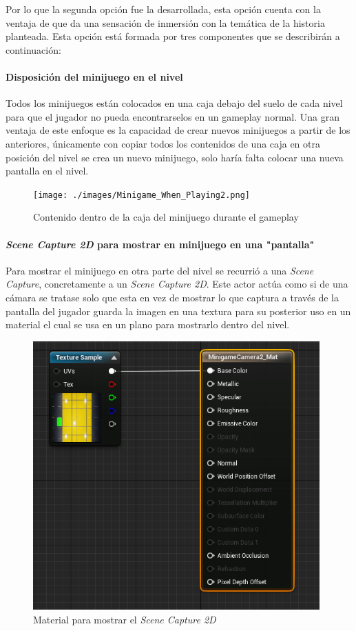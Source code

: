 Por lo que la segunda opción fue la desarrollada, esta opción cuenta con la ventaja de que da una sensación de inmersión con la temática de la historia planteada. Esta opción está formada por tres componentes que se describirán a continuación:

\paragraph{Disposición del minijuego en el nivel}

Todos los minijuegos están colocados en una caja debajo del suelo de cada nivel para que el jugador no pueda encontrarselos en un gameplay normal. Una gran ventaja de este enfoque es la capacidad de crear nuevos minijuegos a partir de los anteriores, únicamente con copiar todos los contenidos de una caja en otra posición del nivel se crea un nuevo minijuego, solo haría falta colocar una nueva pantalla en el nivel. \\

\begin{figure}[H]
  \centering
  \texttt{[image: ./images/Minigame\_When\_Playing2.png]}
  \caption{Contenido dentro de la caja del minijuego durante el gameplay}
  \label{MinigameWhenPlaying}
\end{figure}

\paragraph{\textit{Scene Capture 2D} para mostrar en minijuego en una "pantalla"}
Para mostrar el minijuego en otra parte del nivel se recurrió a una \textit{Scene Capture}, concretamente a un \textit{Scene Capture 2D}. Este actor actúa como si de una cámara se tratase solo que esta en vez de mostrar lo que captura a través de la pantalla del jugador guarda la imagen en una textura para su posterior uso en un material el cual se usa en un plano para mostrarlo dentro del nivel.

\begin{figure}[H]
  \centering
  \includegraphics[width=11cm]{./images/Screen_Capture_To_Mat.png}
  \caption{Material para mostrar el \textit{Scene Capture 2D}}
  \label{SceneCapture2DMat}
\end{figure}


